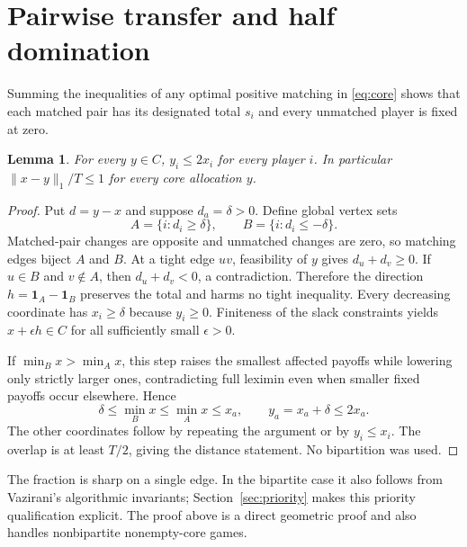 \documentclass[11pt]{article}
\newtheorem{lemma}{Lemma}
\begin{document}
\section{Pairwise transfer and half domination}
Summing the inequalities of any optimal positive matching in \eqref{eq:core}
shows that each matched pair has its designated total $s_i$ and every
unmatched player is fixed at zero.
\begin{lemma}\label{lem:half}
For every $y\in C$, $y_i\le2x_i$ for every player $i$. In particular
$\|x-y\|_1/T\le1$ for every core allocation $y$.
\end{lemma}
\begin{proof}
Put $d=y-x$ and suppose $d_a=\delta>0$. Define global vertex sets
\[
 A=\{i:d_i\ge\delta\},\qquad B=\{i:d_i\le-\delta\}.
\]
Matched-pair changes are opposite and unmatched changes are zero, so matching
edges biject $A$ and $B$. At a tight edge $uv$, feasibility of $y$ gives
$d_u+d_v\ge0$. If $u\in B$ and $v\notin A$, then
$d_u+d_v<0$, a contradiction. Therefore the direction
$h=\mathbf1_A-\mathbf1_B$ preserves the total and harms no tight inequality.
Every decreasing coordinate has $x_i\ge\delta$ because $y_i\ge0$.
Finiteness of the slack constraints yields $x+\epsilon h\in C$ for all
sufficiently small $\epsilon>0$.

If $\min_Bx>\min_Ax$, this step raises the smallest affected payoffs while
lowering only strictly larger ones, contradicting full leximin even when
smaller fixed payoffs occur elsewhere. Hence
\[
 \delta\le\min_Bx\le\min_Ax\le x_a,
 \qquad y_a=x_a+\delta\le2x_a.
\]
The other coordinates follow by repeating the argument or by $y_i\le x_i$.
The overlap is at least $T/2$, giving the distance statement.
No bipartition was used.
\end{proof}
The fraction is sharp on a single edge. In the bipartite case it also follows
from Vazirani's algorithmic invariants; Section~\ref{sec:priority} makes this
priority qualification explicit. The proof above is a direct geometric proof
and also handles nonbipartite nonempty-core games.
\end{document}
